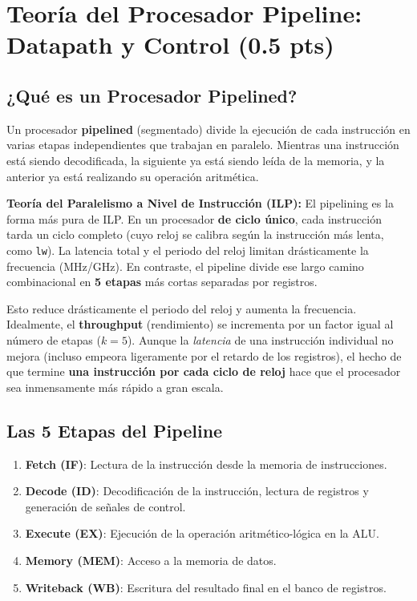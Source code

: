 \documentclass[12pt, a4paper]{article}
\begin{document}
\tableofcontents
\newpage

\section{Teoría del Procesador Pipeline: Datapath y Control (0.5 pts)}

\subsection{¿Qué es un Procesador Pipelined?}

Un procesador \textbf{pipelined} (segmentado) divide la ejecución de cada instrucción en varias etapas independientes que trabajan en paralelo. Mientras una instrucción está siendo decodificada, la siguiente ya está siendo leída de la memoria, y la anterior ya está realizando su operación aritmética.

\textbf{Teoría del Paralelismo a Nivel de Instrucción (ILP):} El pipelining es la forma más pura de ILP. En un procesador \textbf{de ciclo único}, cada instrucción tarda un ciclo completo (cuyo reloj se calibra según la instrucción más lenta, como \texttt{lw}). La latencia total y el periodo del reloj limitan drásticamente la frecuencia (MHz/GHz). En contraste, el pipeline divide ese largo camino combinacional en \textbf{5 etapas} más cortas separadas por registros. 

Esto reduce drásticamente el periodo del reloj y aumenta la frecuencia. Idealmente, el \textbf{throughput} (rendimiento) se incrementa por un factor igual al número de etapas ($k=5$). Aunque la \textit{latencia} de una instrucción individual no mejora (incluso empeora ligeramente por el retardo de los registros), el hecho de que termine \textbf{una instrucción por cada ciclo de reloj} hace que el procesador sea inmensamente más rápido a gran escala.

\subsection{Las 5 Etapas del Pipeline}

\begin{enumerate}
  \item \textbf{Fetch (IF)}: Lectura de la instrucción desde la memoria de instrucciones.
  \item \textbf{Decode (ID)}: Decodificación de la instrucción, lectura de registros y generación de señales de control.
  \item \textbf{Execute (EX)}: Ejecución de la operación aritmético-lógica en la ALU.
  \item \textbf{Memory (MEM)}: Acceso a la memoria de datos.
  \item \textbf{Writeback (WB)}: Escritura del resultado final en el banco de registros.
\end{enumerate}
\end{document}
